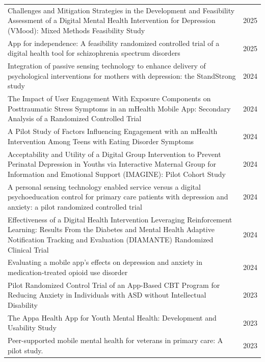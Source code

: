 \begin{longtable}{@{}p{} r@{}}
Challenges and Mitigation Strategies in the Development and Feasibility Assessment of a Digital Mental Health Intervention for Depression (VMood): Mixed Methods Feasibility Study~\cite{chau2025vmood} & 2025 \\
App for independence: A feasibility randomized controlled trial of a digital health tool for schizophrenia spectrum disorders~\cite{kidd2025appindependence} & 2025 \\
Integration of passive sensing technology to enhance delivery of psychological interventions for mothers with depression: the StandStrong study~\cite{vanheerden2024standstrong} & 2024 \\
The Impact of User Engagement With Exposure Components on Posttraumatic Stress Symptoms in an mHealth Mobile App: Secondary Analysis of a Randomized Controlled Trial~\cite{davis2024renewptsd} & 2024 \\
A Pilot Study of Factors Influencing Engagement with an mHealth Intervention Among Teens with Eating Disorder Symptoms~\cite{kasson2024teensengagement} & 2024 \\
Acceptability and Utility of a Digital Group Intervention to Prevent Perinatal Depression in Youths via Interactive Maternal Group for Information and Emotional Support (IMAGINE): Pilot Cohort Study~\cite{ronen2024imagine} & 2024 \\
A personal sensing technology enabled service versus a digital psychoeducation control for primary care patients with depression and anxiety: a pilot randomized controlled trial~\cite{stiles-shields2024personalsensing} & 2024 \\
Effectiveness of a Digital Health Intervention Leveraging Reinforcement Learning: Results From the Diabetes and Mental Health Adaptive Notification Tracking and Evaluation (DIAMANTE) Randomized Clinical Trial~\cite{aguilera2024diamante} & 2024 \\
Evaluating a mobile app's effects on depression and anxiety in medication-treated opioid use disorder~\cite{heinz2024opioidusedisorder} & 2024 \\
Pilot Randomized Control Trial of an App-Based CBT Program for Reducing Anxiety in Individuals with ASD without Intellectual Disability~\cite{yang2023appcbt} & 2023 \\
The Appa Health App for Youth Mental Health: Development and Usability Study~\cite{giovanelli2023appahealth} & 2023 \\
Peer-supported mobile mental health for veterans in primary care: A pilot study.~\cite{blonigen2023peersupported} & 2023 \\

\end{longtable}
